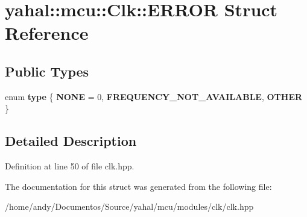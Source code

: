 \hypertarget{structyahal_1_1mcu_1_1_clk_1_1_e_r_r_o_r}{}\section{yahal\+:\+:mcu\+:\+:Clk\+:\+:E\+R\+R\+O\+R Struct Reference}
\label{structyahal_1_1mcu_1_1_clk_1_1_e_r_r_o_r}
\subsection*{Public Types}
\begin{DoxyCompactItemize}
\item 
\hypertarget{structyahal_1_1mcu_1_1_clk_1_1_e_r_r_o_r_a951027d8ffd3221fcc9e1f68421485d9}{}enum {\bfseries type} \{ {\bfseries N\+O\+N\+E} = 0, 
{\bfseries F\+R\+E\+Q\+U\+E\+N\+C\+Y\+\_\+\+N\+O\+T\+\_\+\+A\+V\+A\+I\+L\+A\+B\+L\+E}, 
{\bfseries O\+T\+H\+E\+R}
 \}\label{structyahal_1_1mcu_1_1_clk_1_1_e_r_r_o_r_a951027d8ffd3221fcc9e1f68421485d9}

\end{DoxyCompactItemize}


\subsection{Detailed Description}


Definition at line 50 of file clk.\+hpp.



The documentation for this struct was generated from the following file\+:\begin{DoxyCompactItemize}
\item 
/home/andy/\+Documentos/\+Source/yahal/mcu/modules/clk/clk.\+hpp\end{DoxyCompactItemize}
